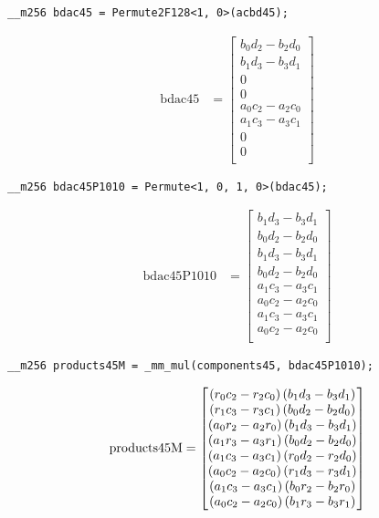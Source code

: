 \begin{verbatim}
__m256 bdac45 = Permute2F128<1, 0>(acbd45);
\end{verbatim} 
\begin{align*}
\mathrm{bdac45} 
&=
\begin{bmatrix}
b_0d_2 - b_2d_0\\
b_1d_3 - b_3d_1\\
0\\
0\\
a_0c_2 - a_2c_0\\
a_1c_3 - a_3c_1\\
0\\
0\\
\end{bmatrix}
\end{align*}

\begin{verbatim}
__m256 bdac45P1010 = Permute<1, 0, 1, 0>(bdac45);
\end{verbatim} 
\begin{align*}
\mathrm{bdac45P1010} 
&=
\begin{bmatrix}
b_1d_3 - b_3d_1\\
b_0d_2 - b_2d_0\\
b_1d_3 - b_3d_1\\
b_0d_2 - b_2d_0\\
a_1c_3 - a_3c_1\\	
a_0c_2 - a_2c_0\\
a_1c_3 - a_3c_1\\	
a_0c_2 - a_2c_0\\	
\end{bmatrix}
\end{align*}


\begin{verbatim}
__m256 products45M = _mm_mul(components45, bdac45P1010);
\end{verbatim} 
\begin{align*}
\mathrm{products45M} 
=
\begin{bmatrix}
\left(r_0c_2 - r_2c_0\right)\left(b_1d_3 - b_3d_1\right)\\
\left(r_1c_3 - r_3c_1\right)\left(b_0d_2 - b_2d_0\right)\\
\left(a_0r_2 - a_2r_0\right)\left(b_1d_3 - b_3d_1\right)\\
\left(a_1r_3 - a_3r_1\right)\left(b_0d_2 - b_2d_0\right)\\
\left(a_1c_3 - a_3c_1\right)\left(r_0d_2 - r_2d_0\right)\\
\left(a_0c_2 - a_2c_0\right)\left(r_1d_3 - r_3d_1\right)\\
\left(a_1c_3 - a_3c_1\right)\left(b_0r_2 - b_2r_0\right)\\
\left(a_0c_2 - a_2c_0\right)\left(b_1r_3 - b_3r_1\right)\\
\end{bmatrix}
\end{align*}


